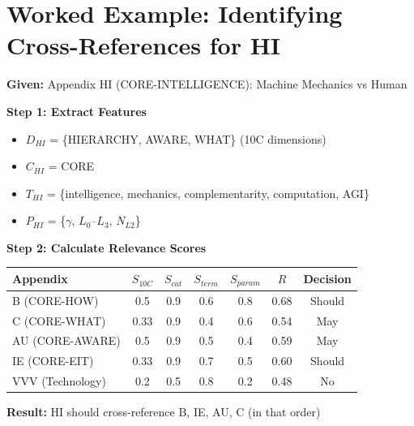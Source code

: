 \section{Worked Example: Identifying Cross-References for HI}
\label{sec:bo-worked-example}

\begin{tcolorbox}[colback=yellow!5!white, colframe=yellow!75!black,
    title=Worked Example: Cross-References for HI (CORE-INTELLIGENCE)]

\textbf{Given:} Appendix HI (CORE-INTELLIGENCE): Machine Mechanics vs Human

\textbf{Step 1: Extract Features}
\begin{itemize}[nosep]
\item $D_{HI}$ = \{HIERARCHY, AWARE, WHAT\} (10C dimensions)
\item $C_{HI}$ = CORE
\item $T_{HI}$ = \{intelligence, mechanics, complementarity, computation, AGI\}
\item $P_{HI}$ = \{$\gamma$, $L_0$--$L_3$, $N_{L2}$\}
\end{itemize}

\textbf{Step 2: Calculate Relevance Scores}

\begin{center}
\begin{tabular}{|l|cccc|c|c|}
\hline
Appendix & $S_{10C}$ & $S_{cat}$ & $S_{term}$ & $S_{param}$ & $R$ & Decision \\
\hline
B (CORE-HOW) & 0.5 & 0.9 & 0.6 & 0.8 & 0.68 & Should \\
C (CORE-WHAT) & 0.33 & 0.9 & 0.4 & 0.6 & 0.54 & May \\
AU (CORE-AWARE) & 0.5 & 0.9 & 0.5 & 0.4 & 0.59 & May \\
IE (CORE-EIT) & 0.33 & 0.9 & 0.7 & 0.5 & 0.60 & Should \\
VVV (Technology) & 0.2 & 0.5 & 0.8 & 0.2 & 0.48 & No \\
\hline
\end{tabular}
\end{center}

\textbf{Result:} HI should cross-reference B, IE, AU, C (in that order)

\end{tcolorbox}



